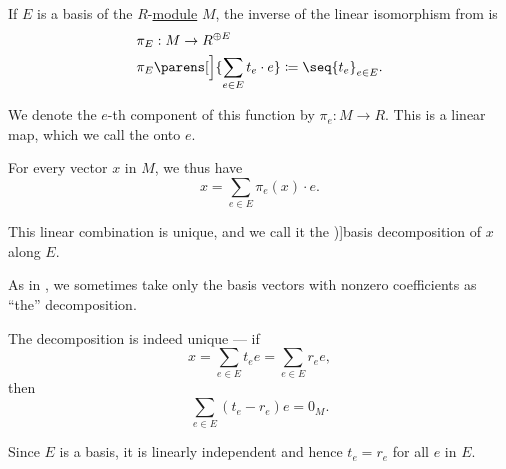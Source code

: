 \begin{definition}\label{def:basis_decomposition}\mimprovised
  If \( E \) is a basis of the \( R \)-\hyperref[def:module]{module} \( M \), the inverse of the linear isomorphism from  is
  \begin{equation*}
    \begin{aligned}
      &\pi_E: M \to R^{\oplus E} \\
      &\pi_E\parens[\Big]{ \sum_{e \in E} t_e \cdot e } \coloneqq \seq{ t_e }_{e \in E}.
    \end{aligned}
  \end{equation*}

  We denote the \( e \)-th component of this function by \( \pi_e: M \to R \). This is a linear map, which we call the  onto \( e \).

  For every vector \( x \) in \( M \), we thus have
  \begin{equation*}
    x = \sum_{e \in E} \pi_e(x) \cdot e.
  \end{equation*}

  This linear combination is unique, and we call it the \term[ru=разложение по базису (\cite[sec. 12.1]{Тыртышников2007})]{basis decomposition} of \( x \) along \( E \).
\end{definition}
\begin{comments}
  \item As in , we sometimes take only the basis vectors with nonzero coefficients as \enquote{the} decomposition.
\end{comments}
\begin{defproof}
  The decomposition is indeed unique --- if
  \begin{equation*}
    x = \sum_{e \in E} t_e e = \sum_{e \in E} r_e e,
  \end{equation*}
  then
  \begin{equation*}
    \sum_{e \in E} (t_e - r_e) e = 0_M.
  \end{equation*}

  Since \( E \) is a basis, it is linearly independent and hence \( t_e = r_e \) for all \( e \) in \( E \).
\end{defproof}

